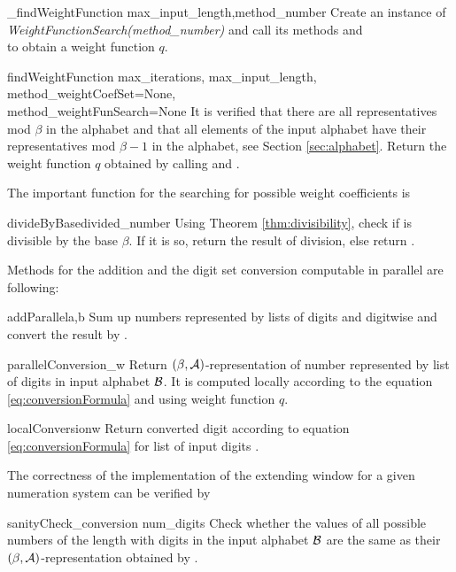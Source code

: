 \begin{method}{\_findWeightFunction}{ max\_input\_length,method\_number}
Create an instance of \emph{WeightFunctionSearch(method\_number)} and call its methods  and \\  to obtain a weight function $q$.
\end{method}


\begin{method}{findWeightFunction}{ max\_iterations, max\_input\_length, method\_weightCoefSet=None,\\ method\_weightFunSearch=None}
It is verified that there are all representatives mod $\beta$ in the alphabet and that all elements of the input alphabet have their representatives mod $\beta-1$ in the alphabet, see Section \ref{sec:alphabet}.
Return the weight function $q$ obtained by calling  and .
\end{method}

The important function for the searching for possible weight coefficients is

\begin{method}{divideByBase}{divided\_number}
Using Theorem \ref{thm:divisibility}, check if  is divisible by the base $\beta$. If it is so, return the result of division, else return .
\end{method}


Methods for the addition and the digit set conversion computable in parallel are following:

\begin{method}{addParallel}{a,b}
Sum up numbers represented by lists of digits  and  digitwise and convert the result by . 
\end{method}


\begin{method}{parallelConversion}{\_w}
Return $(\beta,\mathcal{A})$-representation of number represented by list  of digits in input alphabet $\mathcal{B}$. It is computed locally according to the equation \eqref{eq:conversionFormula} and using weight function $q$.
\end{method}


\begin{method}{localConversion}{w}
Return converted digit according to equation \eqref{eq:conversionFormula} for list of input digits .
\end{method}


The correctness of the implementation of the extending window for a given numeration system can be verified by
 
\begin{method}{sanityCheck\_conversion}{ num\_digits}
Check whether the values of all possible numbers of the length  with digits in the input alphabet $\mathcal{B}$ are the same as their $(\beta, \mathcal{A})$-representation obtained by .   
\end{method}

